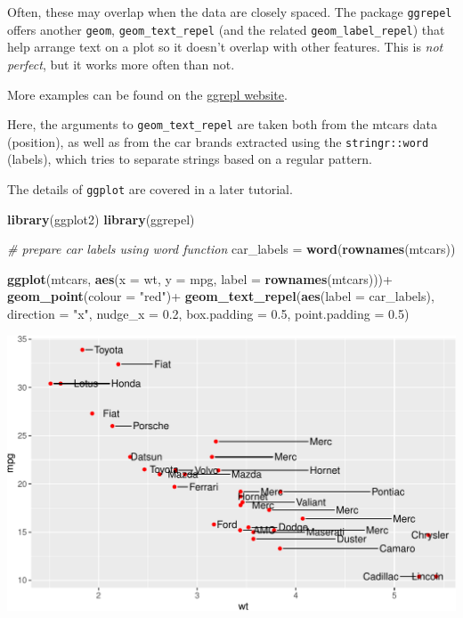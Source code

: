 \documentclass[]{book}
\newenvironment{Shaded}{}{}
\newcommand{\CommentTok}[1]{\textcolor[rgb]{0.38,0.63,0.69}{\textit{#1}}}
\newcommand{\DataTypeTok}[1]{\textcolor[rgb]{0.56,0.13,0.00}{#1}}
\newcommand{\FloatTok}[1]{\textcolor[rgb]{0.25,0.63,0.44}{#1}}
\newcommand{\KeywordTok}[1]{\textcolor[rgb]{0.00,0.44,0.13}{\textbf{#1}}}
\newcommand{\NormalTok}[1]{#1}
\newcommand{\OperatorTok}[1]{\textcolor[rgb]{0.40,0.40,0.40}{#1}}
\newcommand{\StringTok}[1]{\textcolor[rgb]{0.25,0.44,0.63}{#1}}
\begin{document}
Often, these may overlap when the data are closely spaced. The package \texttt{ggrepel} offers another \texttt{geom}, \texttt{geom\_text\_repel} (and the related \texttt{geom\_label\_repel}) that help arrange text on a plot so it doesn't overlap with other features. This is \emph{not perfect}, but it works more often than not.

More examples can be found on the \href{https://github.com/slowkow/ggrepel}{ggrepl website}.

Here, the arguments to \texttt{geom\_text\_repel} are taken both from the mtcars data (position), as well as from the car brands extracted using the \texttt{stringr::word} (labels), which tries to separate strings based on a regular pattern.

The details of \texttt{ggplot} are covered in a later tutorial.

\begin{Shaded}
\begin{Highlighting}[]
\KeywordTok{library}\NormalTok{(ggplot2)}
\KeywordTok{library}\NormalTok{(ggrepel)}

\CommentTok{# prepare car labels using word function}
\NormalTok{car_labels =}\StringTok{ }\KeywordTok{word}\NormalTok{(}\KeywordTok{rownames}\NormalTok{(mtcars))}

\KeywordTok{ggplot}\NormalTok{(mtcars,}
       \KeywordTok{aes}\NormalTok{(}\DataTypeTok{x =}\NormalTok{ wt, }\DataTypeTok{y =}\NormalTok{ mpg,}
           \DataTypeTok{label =} \KeywordTok{rownames}\NormalTok{(mtcars)))}\OperatorTok{+}
\StringTok{  }\KeywordTok{geom_point}\NormalTok{(}\DataTypeTok{colour =} \StringTok{"red"}\NormalTok{)}\OperatorTok{+}
\StringTok{  }\KeywordTok{geom_text_repel}\NormalTok{(}\KeywordTok{aes}\NormalTok{(}\DataTypeTok{label =}\NormalTok{ car_labels),}
                  \DataTypeTok{direction =} \StringTok{"x"}\NormalTok{,}
                  \DataTypeTok{nudge_x =} \FloatTok{0.2}\NormalTok{,}
                  \DataTypeTok{box.padding =} \FloatTok{0.5}\NormalTok{,}
                  \DataTypeTok{point.padding =} \FloatTok{0.5}\NormalTok{)}
\end{Highlighting}
\end{Shaded}

\begin{center}\includegraphics[width=\textwidth]{TRES-Tidy-Tutorial_files/figure-latex/unnamed-chunk-29-1} \end{center}
\end{document}

